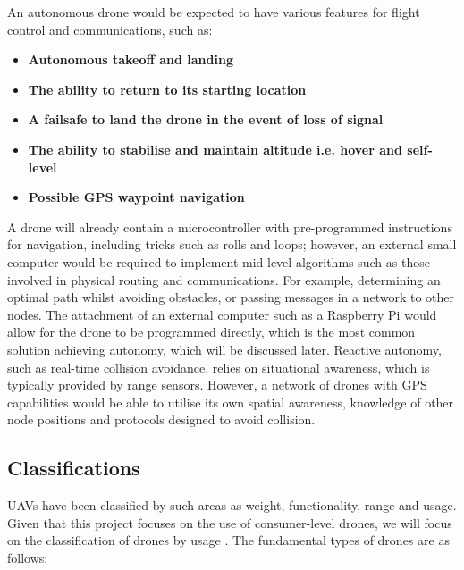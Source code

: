 An autonomous drone would be expected to have various features for flight control and communications, such as:
\begin{itemize}
\item \textbf{Autonomous takeoff and landing}
\item \textbf{The ability to return to its starting location}
\item \textbf{A failsafe to land the drone in the event of loss of signal}
\item \textbf{The ability to stabilise and maintain altitude i.e. hover and self-level}
\item \textbf{Possible GPS waypoint navigation}
\end{itemize}
A drone will already contain a microcontroller with pre-programmed instructions for navigation, including tricks such as rolls and loops; however, an external small computer would be required to implement mid-level algorithms such as those involved in physical routing and communications. For example, determining an optimal path whilst avoiding obstacles, or passing messages in a network to other nodes. The attachment of an external computer such as a Raspberry Pi would allow for the drone to be programmed directly, which is the most common solution achieving autonomy, which will be discussed later.
Reactive autonomy, such as real-time collision avoidance, relies on situational awareness, which is typically provided by range sensors. However, a network of drones with GPS capabilities would be able to utilise its own spatial awareness, knowledge of other node positions and protocols designed to avoid collision. 

\subsection{Classifications}
UAVs have been classified by such areas as weight, functionality, range and usage. Given that this project focuses on the use of consumer-level drones, we will focus on the classification of drones by usage \cite{yashgarg2015}. The fundamental types of drones are as follows:

